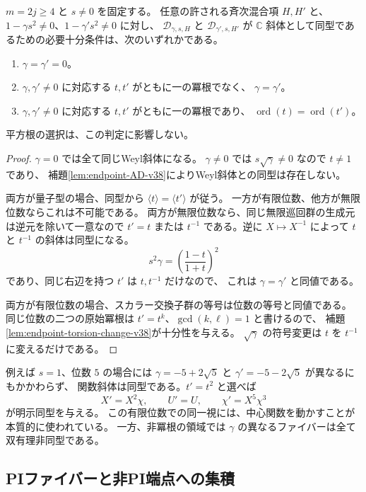 \begin{theorem}[端点族の双有理同型類の完全分類]
\label{thm:endpoint-birational-classification-v38}
$m=2j\ge4$ と $s\ne0$ を固定する。
任意の許される斉次混合項 $H,H'$ と、
$1-\gamma s^2\ne0$、$1-\gamma's^2\ne0$ に対し、
$\mathscr D_{\gamma,s,H}$ と $\mathscr D_{\gamma',s,H'}$ が
$\mathbb C$ 斜体として同型であるための必要十分条件は、次のいずれかである。
\begin{enumerate}
 \item $\gamma=\gamma'=0$。
 \item $\gamma,\gamma'\ne0$ に対応する $t,t'$ がともに一の冪根でなく、
       $\gamma=\gamma'$。
 \item $\gamma,\gamma'\ne0$ に対応する $t,t'$ がともに一の冪根であり、
       $\operatorname{ord}(t)=\operatorname{ord}(t')$。
\end{enumerate}
平方根の選択は、この判定に影響しない。
\end{theorem}

\begin{proof}
$\gamma=0$ では全て同じWeyl斜体になる。
$\gamma\ne0$ では $s\sqrt\gamma\ne0$ なので $t\ne1$ であり、
補題\ref{lem:endpoint-AD-v38}によりWeyl斜体との同型は存在しない。

両方が量子型の場合、同型から $\langle t\rangle=\langle t'\rangle$ が従う。
一方が有限位数、他方が無限位数ならこれは不可能である。
両方が無限位数なら、同じ無限巡回群の生成元は逆元を除いて一意なので
$t'=t$ または $t^{-1}$ である。逆に $X\mapsto X^{-1}$ によって
$t$ と $t^{-1}$ の斜体は同型になる。
\[
 s^2\gamma=\left(\frac{1-t}{1+t}\right)^2
\]
であり、同じ右辺を持つ $t'$ は $t,t^{-1}$ だけなので、
これは $\gamma=\gamma'$ と同値である。

両方が有限位数の場合、スカラー交換子群の等号は位数の等号と同値である。
同じ位数の二つの原始冪根は $t'=t^k$、$\gcd(k,\ell)=1$ と書けるので、
補題\ref{lem:endpoint-torsion-change-v38}が十分性を与える。
$\sqrt\gamma$ の符号変更は $t$ を $t^{-1}$ に変えるだけである。
\end{proof}

例えば $s=1$、位数 $5$ の場合には
$\gamma=-5+2\sqrt5$ と $\gamma'=-5-2\sqrt5$ が異なるにもかかわらず、
関数斜体は同型である。$t'=t^2$ と選べば
\[
 X'=X^2\chi,\qquad U'=U,\qquad \chi'=X^5\chi^3
\]
が明示同型を与える。
この有限位数での同一視には、中心関数を動かすことが本質的に使われている。
一方、非冪根の領域では $\gamma$ の異なるファイバーは全て双有理非同型である。

\subsection{PIファイバーと非PI端点への集積}

